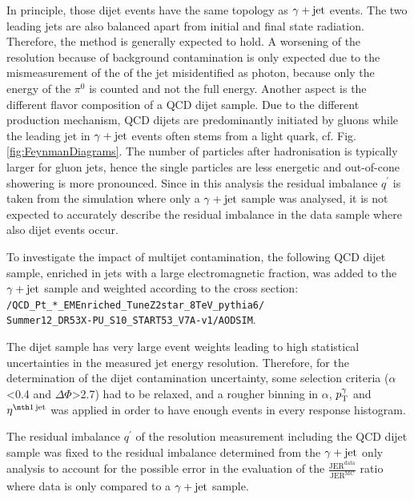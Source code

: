 In principle, those dijet events have the same topology as $\gamma + \text{jet}$ events. The two leading jets are also balanced apart from initial and final state radiation. 
Therefore, the method is generally expected to hold. 
A worsening of the resolution because of background contamination is only expected due to the mismeasurement of the \pt of the jet misidentified as photon,
because only the energy of the $\pi^0$ is counted and not the full energy.
Another aspect is the different flavor composition of a QCD dijet sample. 
Due to the different production mechanism, QCD dijets are predominantly initiated by gluons 
while the leading jet in $\gamma + \text{jet}$ events often stems from a light quark, cf. Fig.\ref{fig:FeynmanDiagrams}.
The number of particles after hadronisation is typically larger for gluon jets, hence the single particles are less energetic and out-of-cone showering is more pronounced.
Since in this analysis the residual imbalance $q^{\prime}$ is taken from the simulation where only a $\gamma + \text{jet}$ sample was analysed, 
it is not expected to accurately describe the residual imbalance in the data sample where also dijet events occur.

To investigate the impact of multijet contamination, the following QCD dijet sample, enriched in jets with a large electromagnetic fraction, 
was added to the $\gamma + \text{jet}$ sample and weighted according to the cross section:\\
\texttt{/QCD\_Pt\_*\_EMEnriched\_TuneZ2star\_8TeV\_pythia6/}\\
\texttt{Summer12\_DR53X-PU\_S10\_START53\_V7A-v1/AODSIM}.

The dijet sample has very large event weights leading to high statistical uncertainties in the measured jet energy resolution. 
Therefore, for the determination of the dijet contamination uncertainty, some selection criteria ($\alpha$<0.4 and $\Delta\Phi$>2.7) had to be relaxed, 
and a rougher binning in $\alpha$, $p_{\text{T}}^{\gamma}$ and $\etafirstjet$ was applied in order to have enough events in every response histogram. 

The residual imbalance $q^{\prime}$ of the resolution measurement including the QCD dijet sample was fixed to the residual imbalance determined from the $\gamma + \text{jet}$ only analysis to account for the possible error 
in the evaluation of the $\frac{\text{JER}^{\text{data}}}{\text{JER}^{\text{MC}}}$ ratio where data is only compared to a $\gamma + \text{jet}$ sample.

